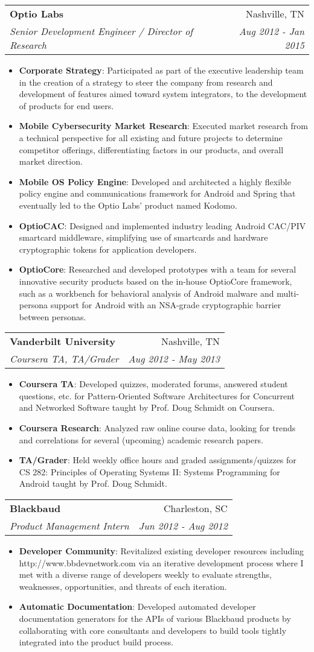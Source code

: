 \documentclass[letterpaper,10pt]{article}
\makeatletter
\newcommand{\resumeItem}[2]{
  \item\small{
    \textbf{#1}{: #2 \vspace{-2pt}}
  }
}
\newcommand{\resumeSubheading}[4]{
  \vspace{-1pt}\item
    \begin{tabular*}{0.97\textwidth}{l@{\extracolsep{\fill}}r}
      \textbf{#1} & #2 \\
      \textit{\small#3} & \textit{\small #4} \\
    \end{tabular*}\vspace{-5pt}
}
\newcommand{\resumeItemListStart}{\begin{itemize}}
\newcommand{\resumeItemListEnd}{\end{itemize}\vspace{-5pt}}
\makeatother
\begin{document}
    \resumeSubheading
      {Optio Labs}{Nashville, TN}
      {Senior Development Engineer / Director of Research}{Aug 2012 - Jan 2015}
      \resumeItemListStart
        \resumeItem{Corporate Strategy}
          {Participated as part of the executive leadership team in the creation of a strategy to steer the company from research and development of features aimed toward system integrators, to the development of products for end users.}
        \resumeItem{Mobile Cybersecurity Market Research}
          {Executed market research from a technical perspective for all existing and future projects to determine competitor offerings, differentiating factors in our products, and overall market direction.}
        \resumeItem{Mobile OS Policy Engine}
          {Developed and architected a highly flexible policy engine and communications framework for Android and Spring that eventually led to the Optio Labs’ product named Kodomo.}
        \resumeItem{OptioCAC}
          {Designed and implemented industry leading Android CAC/PIV smartcard middleware, simplifying use of smartcards and hardware cryptographic tokens for application developers.}
        \resumeItem{OptioCore}
          {Researched and developed prototypes with a team for several innovative security products based on the in-house OptioCore framework, such as a workbench for behavioral analysis of Android malware and multi-persona support for Android with an NSA-grade cryptographic barrier between personas.}
      \resumeItemListEnd
      
    \resumeSubheading
      {Vanderbilt University}{Nashville, TN}
      {Coursera TA, TA/Grader}{Aug 2012 - May 2013}
      \resumeItemListStart
        \resumeItem{Coursera TA}
          {Developed quizzes, moderated forums, answered student questions, etc. for Pattern-Oriented Software Architectures for Concurrent and Networked Software taught by Prof. Doug Schmidt on Coursera.}
        \resumeItem{Coursera Research}
          {Analyzed raw online course data, looking for trends and correlations for several (upcoming) academic research papers.}
        \resumeItem{TA/Grader}
          {Held weekly office hours and graded assignments/quizzes for CS 282: Principles of Operating Systems II: Systems Programming for Android taught by Prof. Doug Schmidt.}
      \resumeItemListEnd
      
    \resumeSubheading
      {Blackbaud}{Charleston, SC}
      {Product Management Intern}{Jun 2012 - Aug 2012}
      \resumeItemListStart
        \resumeItem{Developer Community}
          {Revitalized existing developer resources including http://www.bbdevnetwork.com via an iterative development process where I met with a diverse range of developers weekly to evaluate strengths, weaknesses, opportunities, and threats of each iteration.}
        \resumeItem{Automatic Documentation}
          {Developed automated developer documentation generators for the APIs of various Blackbaud products by collaborating with core consultants and developers to build tools tightly integrated into the product build process.}
      \resumeItemListEnd
\end{document}
